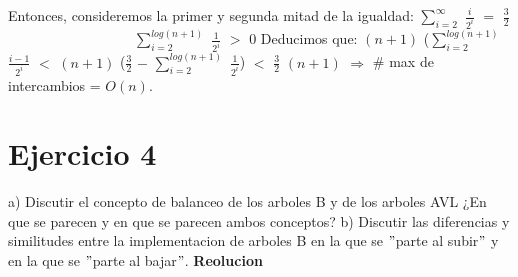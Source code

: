 \documentclass[10pt,a4paper]{article}
\begin{document}
\newline
\newline
\newline
Entonces, consideremos la primer y segunda mitad de la igualdad:
\newline
\newline
$\displaystyle \sum_{i=2}^{\infty}$ $\displaystyle \frac{i}{2^{i}}$ $=$ $\displaystyle \frac{3}{2}$~~~~~~~~~~~~~~~~~~$\displaystyle \sum_{i=2}^{log(n+1)}$ $\displaystyle \frac{1}{2^{i}}$ $>$ $0$
\newline
\newline
\newline
Deducimos que:
\newline
\newline
$(n+1)$ ($\displaystyle \sum_{i=2}^{log(n+1)}$ $\displaystyle \frac{i-1}{2^{i}}$ $<$ $(n+1)$ ($\displaystyle \frac{3}{2}$ $-$ $\displaystyle \sum_{i=2}^{log(n+1)}$ $\displaystyle \frac{1}{2^{i}}$) $<$ $\displaystyle \frac{3}{2}$ $(n+1)$ $\Rightarrow$ \# max de intercambios = $O(n)$.
\newpage

\section{Ejercicio 4}

a) Discutir el concepto de balanceo de los arboles B y de los arboles AVL ¿En que se parecen y en que se parecen ambos conceptos?
\newline
\newline
b) Discutir las diferencias y similitudes entre la implementacion de arboles B en la que se $"$parte al subir$"$ y en la que se $"$parte al bajar$"$.
\newline
\newline
\textbf{Reolucion}
\newpage
\end{document}
